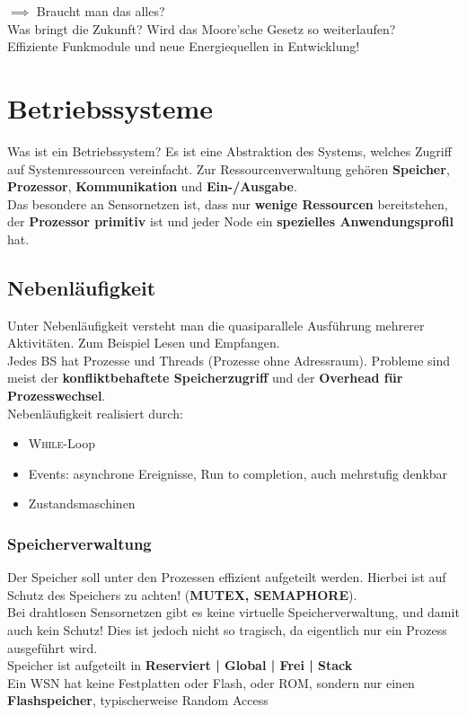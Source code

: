 \documentclass[a4paper]{article}
\begin{document}
$\implies$ Braucht man das alles?\\

Was bringt die Zukunft? Wird das Moore'sche Gesetz so weiterlaufen?\\
Effiziente Funkmodule und neue Energiequellen in Entwicklung!
\newpage
\section{Betriebssysteme}
Was ist ein Betriebssystem? Es ist eine Abstraktion des Systems, welches Zugriff auf Systemressourcen vereinfacht. Zur Ressourcenverwaltung gehören \textbf{Speicher}, \textbf{Prozessor}, \textbf{Kommunikation} und \textbf{Ein-/Ausgabe}.\\

Das besondere an Sensornetzen ist, dass nur \textbf{wenige Ressourcen} bereitstehen, der \textbf{Prozessor primitiv} ist und jeder Node ein \textbf{spezielles Anwendungsprofil} hat.
\subsection{Nebenläufigkeit}
Unter Nebenläufigkeit versteht man die quasiparallele Ausführung mehrerer Aktivitäten. Zum Beispiel Lesen und Empfangen.\\
Jedes BS hat Prozesse und Threads (Prozesse ohne Adressraum). Probleme sind meist der \textbf{konfliktbehaftete Speicherzugriff} und der \textbf{Overhead für Prozesswechsel}.\\
Nebenläufigkeit realisiert durch:
\begin{itemize}
	\item \textsc{While}-Loop
	\item Events: asynchrone Ereignisse, Run to completion, auch mehrstufig denkbar
	\item Zustandsmaschinen
\end{itemize}
\subsubsection{Speicherverwaltung}
Der Speicher soll unter den Prozessen effizient aufgeteilt werden. Hierbei ist auf Schutz des Speichers zu achten!  (\textbf{MUTEX, SEMAPHORE}).\\
 Bei drahtlosen Sensornetzen gibt es keine virtuelle Speicherverwaltung, und damit auch kein Schutz! Dies ist jedoch nicht so tragisch, da eigentlich nur ein Prozess ausgeführt wird.\\
 Speicher ist aufgeteilt in \textbf{Reserviert |   Global   |     Frei   | Stack}\\
 Ein WSN hat keine Festplatten oder Flash, oder ROM, sondern nur einen \textbf{Flashspeicher}, typischerweise Random Access
\end{document}
